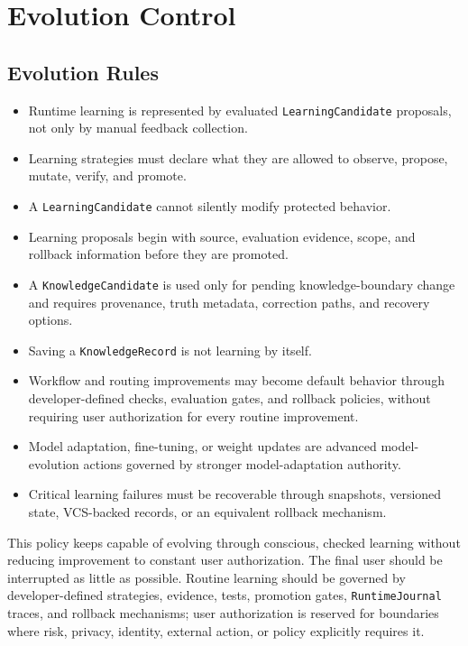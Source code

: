 \section{Evolution Control}

\subsection{Evolution Rules}

\begin{itemize}
	\item Runtime learning is represented by evaluated \texttt{LearningCandidate} proposals, not only by manual feedback collection.
	\item Learning strategies must declare what they are allowed to observe, propose, mutate, verify, and promote.
	\item A \texttt{LearningCandidate} cannot silently modify protected behavior.
	\item Learning proposals begin with source, evaluation evidence, scope, and rollback information before they are promoted.
	\item A \texttt{KnowledgeCandidate} is used only for pending knowledge-boundary change and requires provenance, truth metadata, correction paths, and recovery options.
	\item Saving a \texttt{KnowledgeRecord} is not learning by itself.
	\item Workflow and routing improvements may become default behavior through developer-defined checks, evaluation gates, and rollback policies, without requiring user authorization for every routine improvement.
	\item Model adaptation, fine-tuning, or weight updates are advanced model-evolution actions governed by stronger model-adaptation authority.
	\item Critical learning failures must be recoverable through snapshots, versioned state, VCS-backed records, or an equivalent rollback mechanism.
\end{itemize}

This policy keeps \Madre capable of evolving through conscious, checked learning without reducing improvement to constant user authorization. The final user should be interrupted as little as possible. Routine learning should be governed by developer-defined strategies, evidence, tests, promotion gates, \texttt{RuntimeJournal} traces, and rollback mechanisms; user authorization is reserved for boundaries where risk, privacy, identity, external action, or policy explicitly requires it.

